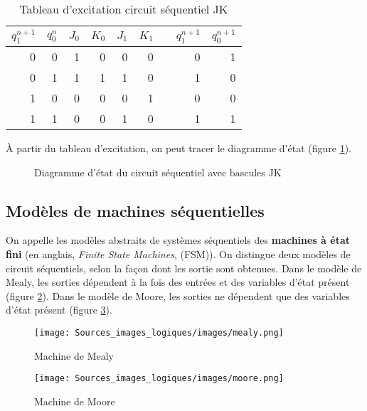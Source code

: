 \documentclass[11pt]{article}
\begin{document}
\begin{table}[htbp]
\caption{\label{tab:org142dd08}Tableau d'excitation circuit séquentiel JK}
\centering
\begin{tabular}{rrrrrrlrr}
\(q_1^{n+1}\) & \(q_0^n\) & \(J_0\) & \(K_0\) & \(J_1\) & \(K_1\) &  & \(q_1^{n+1}\) & \(q_0^{n+1}\)\\
\hline
0 & 0 & 1 & 0 & 0 & 0 &  & 0 & 1\\
0 & 1 & 1 & 1 & 1 & 0 &  & 1 & 0\\
1 & 0 & 0 & 0 & 0 & 1 &  & 0 & 0\\
1 & 1 & 0 & 0 & 1 & 0 &  & 1 & 1\\
\end{tabular}
\end{table}

À partir du tableau d'excitation, on peut tracer le diagramme d'état
(figure \ref{fig:org714d0c2}).

\begin{figure}[htbp]
\centering

\caption{\label{fig:org714d0c2}Diagramme d'état du circuit séquentiel avec bascules JK}
\end{figure}

\subsection{Modèles de machines séquentielles}
\label{sec:org5262c35}

On appelle les modèles abstraits de systèmes séquentiels des \textbf{machines
à état fini} (en anglais, \emph{Finite State Machines}, (FSM)).  On
distingue deux modèles de circuit séquentiels, selon la façon dont les
sortie sont obtenues. Dans le modèle de Mealy, les sorties dépendent à
la fois des entrées et des variables d'état présent (figure \ref{fig:org4b0414d}). Dans
le modèle de Moore, les sorties ne dépendent que des variables d'état présent
(figure \ref{fig:org06e2e74}). 

\begin{figure}[htbp]
\centering
\texttt{[image: Sources\_images\_logiques/images/mealy.png]}
\caption{\label{fig:org4b0414d}Machine de Mealy}
\end{figure}

\begin{figure}[htbp]
\centering
\texttt{[image: Sources\_images\_logiques/images/moore.png]}
\caption{\label{fig:org06e2e74}Machine de Moore}
\end{figure}
\end{document}
